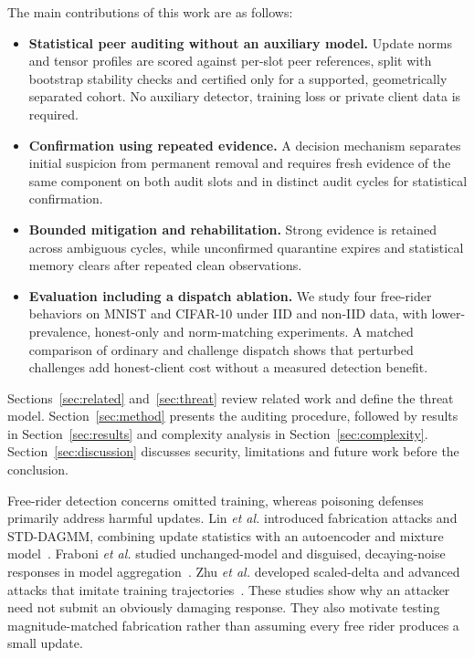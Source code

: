\documentclass[journal]{IEEEtran}
\makeatletter
\renewcommand{\section}{\@startsection{section}{1}{\z@}{1.5ex}{0.7ex}{\normalfont\normalsize\centering\scshape}}
\makeatother
\begin{document}
\noindent The main contributions of this work are as follows:
\begin{itemize} %
\item \textbf{Statistical peer auditing without an auxiliary model.} Update
norms and tensor profiles are scored against per-slot peer references,
split with bootstrap stability checks and certified only for a supported,
geometrically separated cohort. No auxiliary detector, training loss or
private client data is required.
\item \textbf{Confirmation using repeated evidence.} A decision mechanism
separates initial suspicion from permanent removal and requires fresh
evidence of the same component on both audit slots and in distinct audit
cycles for statistical confirmation.
\item \textbf{Bounded mitigation and rehabilitation.} Strong evidence is
retained across ambiguous cycles, while unconfirmed quarantine expires and
statistical memory clears after repeated clean observations.
\item \textbf{Evaluation including a dispatch ablation.} We study four
free-rider behaviors on MNIST and CIFAR-10 under IID and non-IID data, with
lower-prevalence, honest-only and norm-matching experiments. A matched
comparison of ordinary and challenge dispatch shows that perturbed
challenges add honest-client cost without a measured detection benefit.
\end{itemize}

Sections~\ref{sec:related} and~\ref{sec:threat} review related work and
define the threat model. Section~\ref{sec:method} presents the auditing
procedure, followed by results in Section~\ref{sec:results} and complexity
analysis in Section~\ref{sec:complexity}. Section~\ref{sec:discussion}
discusses security, limitations and future work before the conclusion.

\section{Literature Review}\label{sec:related}
Free-rider detection concerns omitted training, whereas poisoning
defenses primarily address harmful updates. Lin \emph{et al.} introduced
fabrication attacks and STD-DAGMM, combining update statistics with an
autoencoder and mixture model~\cite{lin2019freeriders,zong2018dagmm}.
Fraboni \emph{et al.} studied unchanged-model and disguised, decaying-noise
responses in model aggregation~\cite{fraboni2021freerider}. Zhu \emph{et al.}
developed scaled-delta and advanced attacks that imitate training
trajectories~\cite{zhu2021advanced}. These studies show why an attacker
need not submit an obviously damaging response. They also motivate
testing magnitude-matched fabrication rather than assuming every free
rider produces a small update.
\end{document}
